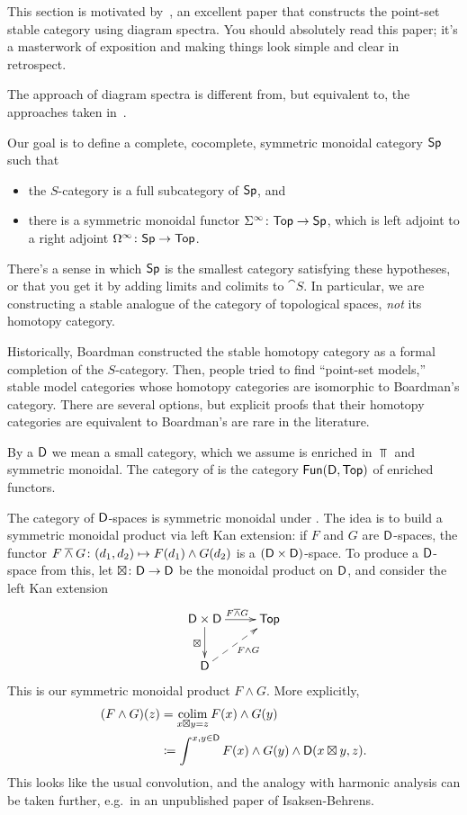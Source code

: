 This section is motivated by~\cite{MMSS}, an excellent paper that constructs the point-set stable category using
diagram spectra. You should absolutely read this paper; it's a masterwork of exposition and making things look
simple and clear in retrospect.

The approach of diagram spectra is different from, but equivalent to, the approaches taken
in~\cite{LMS,AlaskaNotes}.

Our goal is to define a complete, cocomplete, symmetric monoidal category $\mathsf{Sp}$ such that
\begin{itemize}
	\item the $S$-category is a full subcategory of $\mathsf{Sp}$, and
	\item there is a symmetric monoidal functor $\Sigma^\infty\colon\mathsf{Top}\to\mathsf{Sp}$, which is left adjoint to a right
	adjoint $\Omega^\infty\colon\mathsf{Sp}\to\mathsf{Top}$.
\end{itemize}
There's a sense in which $\mathsf{Sp}$ is the smallest category satisfying these hypotheses, or that you get it by adding
limits and colimits to $\cat S$. In particular, we are constructing a stable analogue of the category of
topological spaces, \emph{not} its homotopy category.
\begin{rem}
Historically, Boardman constructed the stable homotopy category as a formal completion of the $S$-category. Then,
people tried to find ``point-set models,'' stable model categories whose homotopy categories are isomorphic to
Boardman's category. There are several options, but explicit proofs that their homotopy categories are equivalent to
Boardman's are rare in the literature.
\end{rem}
\begin{defn}
By a  $\mathsf D$ we mean a small category, which we assume is enriched in $\Top$ and symmetric monoidal.
The category of  is the category $\mathsf{Fun}(\mathsf D,\mathsf{Top})$ of enriched functors.
\end{defn}
The category of $\mathsf D$-spaces is symmetric monoidal under . The idea is to build a symmetric
monoidal product via left Kan extension: if $F$ and $G$ are $\mathsf D$-spaces, the functor $F\overwedge
G\colon(d_1,d_2)\mapsto F(d_1)\wedge G(d_2)$ is a $(\mathsf D\times\mathsf D)$-space. To produce a $\mathsf D$-space from this, let
$\boxtimes\colon\mathsf D\to\mathsf D$ be the monoidal product on $\mathsf D$, and consider the left Kan extension
\[\xymatrix{
	\fD\times\fD\ar[r]^{F\overwedge G}\ar[d]_\boxtimes & \Top\\
	\fD\ar@{-->}[ur]_{F\wedge G}
}\]
This is our symmetric monoidal product $F\wedge G$. More explicitly,
\begin{align*}
( F\wedge G)(z) &= \operatorname*{colim}_{x\boxtimes y = z} F(x)\wedge G(y)\\
								&\coloneqq \int^{x, y\in \mathsf D} F(x) \wedge G(y) \wedge \mathsf D(x\boxtimes y, z).
\end{align*}
This looks like the usual convolution, and the analogy with harmonic analysis can be taken further, e.g.\ in an
unpublished paper of Isaksen-Behrens.

